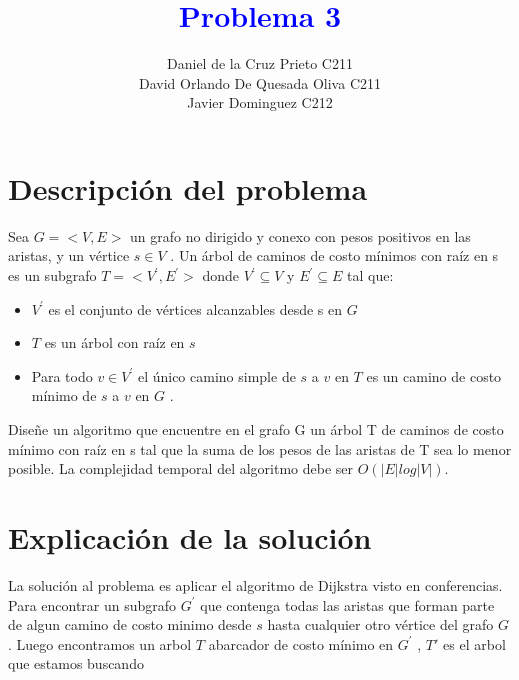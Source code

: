 \documentclass{article}
\begin{document}
    \title{\textcolor{blue}{\textbf{Problema 3 }}\\}
    \author{Daniel de la Cruz Prieto C211\\ David Orlando De Quesada Oliva C211\\Javier Dominguez C212} 
    \date{}
    \maketitle  

    \section{Descripci\'on del problema} 

    Sea $G = <V,E>$ un grafo no dirigido y conexo con pesos positivos en las aristas, y un v\'ertice $s \in V$ . Un \'arbol de 
    caminos de costo m\'inimos con ra\'iz en s es un subgrafo $T = <V^{'} , E^{'}> $ donde $V^{'} \subseteq  V $     y $E^{'} \subseteq  E $ tal que: 
    
    \begin{itemize}
        \item $V^{'}$ es el conjunto de v\'ertices alcanzables desde s en $G$
        \item $T$ es un \'arbol con ra\'iz en $s$
        \item Para todo $v \in V^{'}$ el \'unico camino simple de $s$ a $v$ en $T$ es un camino de costo m\'inimo de $s$ a $v$ en $G$ .
    \end{itemize}

    \noindent Dise\~ne un algoritmo que encuentre en el grafo G un \'arbol T de caminos de costo m\'inimo con ra\'iz en s tal que
    la suma de los pesos de las aristas de T sea lo menor posible. La complejidad temporal del algoritmo debe ser
    $O(|E|log|V|)$.


    \section{ Explicaci\'on de la soluci\'on }

    \noindent La soluci\'on al problema es aplicar el algoritmo de  Dijkstra visto en conferencias.
    Para encontrar un subgrafo $G^{'}$ que contenga todas las aristas que forman parte de algun camino de 
    costo minimo desde $s$ hasta cualquier otro v\'ertice del grafo $G$. Luego encontramos un arbol $T$ abarcador de 
    costo m\'inimo en $G^{'}$ , $T'$ es el arbol que estamos buscando 
\end{document}

